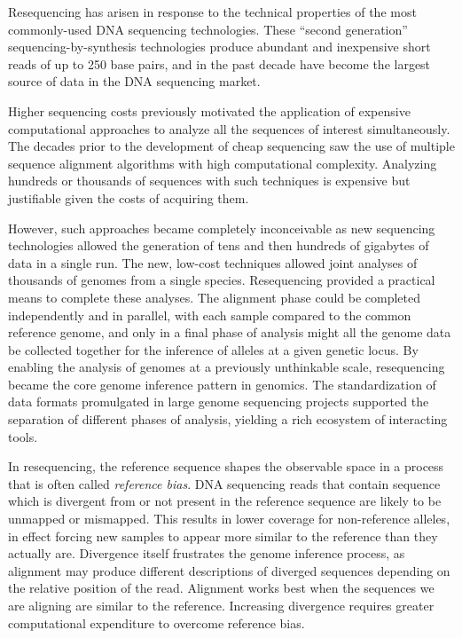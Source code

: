 Resequencing has arisen in response to the technical properties of the most commonly-used DNA sequencing technologies.
These ``second generation'' sequencing-by-synthesis technologies produce abundant and inexpensive short reads of up to 250 base pairs, and in the past decade have become the largest source of data in the DNA sequencing market.

Higher sequencing costs previously motivated the application of expensive computational approaches to analyze all the sequences of interest simultaneously.
The decades prior to the development of cheap sequencing saw the use of multiple sequence alignment algorithms with high computational complexity.
Analyzing hundreds or thousands of sequences with such techniques is expensive but justifiable given the costs of acquiring them.

However, such approaches became completely inconceivable as new sequencing technologies allowed the generation of tens and then hundreds of gigabytes of data in a single run.
The new, low-cost techniques allowed joint analyses of thousands of genomes from a single species.
Resequencing provided a practical means to complete these analyses.
The alignment phase could be completed independently and in parallel, with each sample compared to the common reference genome, and only in a final phase of analysis might all the genome data be collected together for the inference of alleles at a given genetic locus.
By enabling the analysis of genomes at a previously unthinkable scale, resequencing became the core genome inference pattern in genomics.
The standardization of data formats promulgated in large genome sequencing projects supported the separation of different phases of analysis, yielding a rich ecosystem of interacting tools.

In resequencing, the reference sequence shapes the observable space in a process that is often called \emph{reference bias}.
DNA sequencing reads that contain sequence which is divergent from or not present in the reference sequence are likely to be unmapped or mismapped.
This results in lower coverage for non-reference alleles, in effect forcing new samples to appear more similar to the reference than they actually are.
Divergence itself frustrates the genome inference process, as alignment may produce different descriptions of diverged sequences depending on the relative position of the read.
Alignment works best when the sequences we are aligning are similar to the reference.
Increasing divergence requires greater computational expenditure to overcome reference bias.

